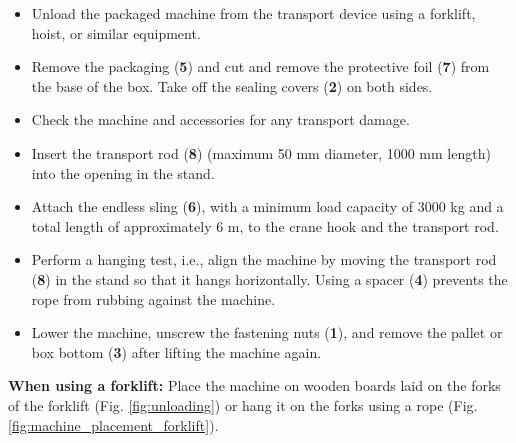 \begin{itemize}
    \item Unload the packaged machine from the transport device using a forklift, hoist, or similar equipment.
    \item Remove the packaging (\textbf{5}) and cut and remove the protective foil (\textbf{7}) from the base of the box. Take off the sealing covers (\textbf{2}) on both sides.
    \item Check the machine and accessories for any transport damage.
\end{itemize}


\begin{itemize}
    \item Insert the transport rod (\textbf{8}) (maximum 50 mm diameter, 1000 mm length) into the opening in the stand.
    \item Attach the endless sling (\textbf{6}), with a minimum load capacity of 3000 kg and a total length of approximately 6 m, to the crane hook and the transport rod.
\end{itemize}



\begin{itemize}
    \item Perform a hanging test, i.e., align the machine by moving the transport rod (\textbf{8}) in the stand so that it hangs horizontally. Using a spacer (\textbf{4}) prevents the rope from rubbing against the machine.
    
    \item Lower the machine, unscrew the fastening nuts (\textbf{1}), and remove the pallet or box bottom (\textbf{3}) after lifting the machine again.
\end{itemize}

\noindent\textbf{When using a forklift:} Place the machine on wooden boards laid on the forks of the forklift (Fig. \ref{fig:unloading}) or hang it on the forks using a rope (Fig. \ref{fig:machine_placement_forklift}).
    
\vspace{1em} %

